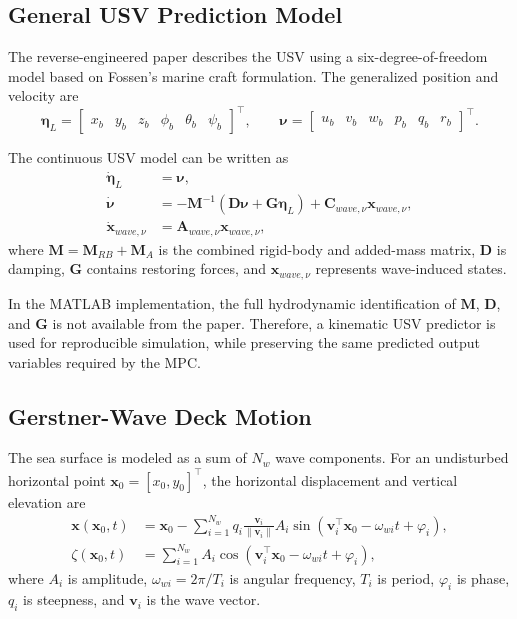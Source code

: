 \documentclass[12pt,a4paper]{article}
\begin{document}
\subsection{General USV Prediction Model}

The reverse-engineered paper describes the USV using a six-degree-of-freedom model based on Fossen's marine craft formulation. The generalized position and velocity are
\begin{equation}
\bm{\eta}_{L} =
\begin{bmatrix}
x_b & y_b & z_b & \phi_b & \theta_b & \psi_b
\end{bmatrix}^{\top}, \qquad
\bm{\nu} =
\begin{bmatrix}
u_b & v_b & w_b & p_b & q_b & r_b
\end{bmatrix}^{\top}.
\end{equation}

The continuous USV model can be written as
\begin{align}
\dot{\bm{\eta}}_{L} &= \bm{\nu}, \label{eq:usv_eta}\\
\dot{\bm{\nu}} &= -\bm{M}^{-1}(\bm{D}\bm{\nu}+\bm{G}\bm{\eta}_{L}) + \bm{C}_{wave,\nu}\bm{x}_{wave,\nu}, \label{eq:usv_nu}\\
\dot{\bm{x}}_{wave,\nu} &= \bm{A}_{wave,\nu}\bm{x}_{wave,\nu}, \label{eq:wave_state}
\end{align}
where $\bm{M}=\bm{M}_{RB}+\bm{M}_{A}$ is the combined rigid-body and added-mass matrix, $\bm{D}$ is damping, $\bm{G}$ contains restoring forces, and $\bm{x}_{wave,\nu}$ represents wave-induced states.

In the MATLAB implementation, the full hydrodynamic identification of $\bm{M}$, $\bm{D}$, and $\bm{G}$ is not available from the paper. Therefore, a kinematic USV predictor is used for reproducible simulation, while preserving the same predicted output variables required by the MPC.

\subsection{Gerstner-Wave Deck Motion}

The sea surface is modeled as a sum of $N_w$ wave components. For an undisturbed horizontal point $\bm{x}_0=[x_0,y_0]^{\top}$, the horizontal displacement and vertical elevation are
\begin{align}
\bm{x}(\bm{x}_0,t)
&= \bm{x}_0 -
\sum_{i=1}^{N_w}
q_i \frac{\bm{v}_i}{\|\bm{v}_i\|}
A_i
\sin(\bm{v}_i^{\top}\bm{x}_0-\omega_{wi}t+\varphi_i), \\
\zeta(\bm{x}_0,t)
&=
\sum_{i=1}^{N_w}
A_i
\cos(\bm{v}_i^{\top}\bm{x}_0-\omega_{wi}t+\varphi_i),
\end{align}
where $A_i$ is amplitude, $\omega_{wi}=2\pi/T_i$ is angular frequency, $T_i$ is period, $\varphi_i$ is phase, $q_i$ is steepness, and $\bm{v}_i$ is the wave vector.
\end{document}

